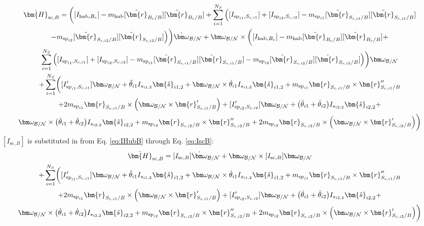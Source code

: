 \begin{multline}
	\dot{\bm{H}}_{\text{sc},B} = \bigg([I_{\text{hub},B_c}]  - m_{\text{hub}} [\tilde{\bm{r}}_{B_c/B}] [\tilde{\bm{r}}_{B_c/B}] +
	\sum\limits_{i=1}^{N_S} \Big([I_{\text{sp}_{i1},S_{c,i1}}]+ [I_{\text{sp}_{i2},S_{c,i2}}] - m_{\text{sp}_{i1}} [\tilde{\bm{r}}_{S_{c,i1}/B}] [\tilde{\bm{r}}_{S_{c,i1}/B}] \\
	- m_{\text{sp}_{i2}} [\tilde{\bm{r}}_{S_{c,i2}/B}] [\tilde{\bm{r}}_{S_{c,i2}/B}]   \Big)\bigg)\dot{\bm\omega}_{\cal B/N}	+ \bm\omega_{\cal B/N} \times \bigg([I_{\text{hub},B_c}] - m_{\text{hub}} [\tilde{\bm{r}}_{B_c/B}] [\tilde{\bm{r}}_{B_c/B}] + \\
	\sum\limits_{i=1}^{N_S}\Big(  [I_{\text{sp}_{i1},S_{c,i1}}]+ [I_{\text{sp}_{i2},S_{c,i2}}] - m_{\text{sp}_{i1}} [\tilde{\bm{r}}_{S_{c,i1}/B}] [\tilde{\bm{r}}_{S_{c,i1}/B}] - m_{\text{sp}_{i2}} [\tilde{\bm{r}}_{S_{c,i2}/B}] [\tilde{\bm{r}}_{S_{c,i2}/B}]  \Big) \bigg) \bm\omega_{\cal B/N} \\
	+\sum\limits_{i=1}^{N_S} \biggl( [I'_{\text{sp}_{i1},S_{c,i1}}] \bm\omega_{\cal B/N}
	+ \ddot{\theta}_{i1} I_{s_{i1,2}}\bm{\hat{s}}_{i1,2}+ \bm\omega_{\cal B/N} \times \dot{\theta}_{i1} I_{s_{i1,2}}\bm{\hat{s}}_{i1,2}	+m_{\text{sp}_{i1}} \bm{r}_{S_{c,i1}/B} \times \bm{r}''_{S_{c,i1}/B} \\
	+ 2 m_{\text{sp}_{i1}} \bm{r}_{S_{c,i1}/B} \times \Big( \bm\omega_{\cal B/N} \times \bm{r}'_{S_{c,i1}/B}\Big)	+ [I'_{\text{sp}_{i2},S_{c,i2}}] \bm\omega_{\cal B/N}
	+ \big(\ddot{\theta}_{i1} + \ddot{\theta}_{i2}\big) I_{s_{i2,2}}\bm{\hat{s}}_{i2,2}+ \\
	\bm\omega_{\cal B/N} \times \big(\dot{\theta}_{i1} + \dot{\theta}_{i2}\big) I_{s_{i2,2}}\bm{\hat{s}}_{i2,2}
	+m_{\text{sp}_{i2}} \bm{r}_{S_{c,i2}/B} \times \bm{r}''_{S_{c,i2}/B} + 2 m_{\text{sp}_{i2}} \bm{r}_{S_{c,i2}/B} \times \Big(\bm\omega_{\cal B/N} \times \bm{r}'_{S_{c,i2}/B}\Big)\biggr)
	\label{eq:Hbdot17}
\end{multline}
$[I_{\text{sc},B}]$ is substituted in from Eq. \ref{eq:IHubB} through Eq. \ref{eq:IscB}:
\begin{multline}
	\dot{\bm{H}}_{\text{sc},B} = [I_{\text{sc},B}]\dot{\bm\omega}_{\cal B/N}	+ \bm\omega_{\cal B/N} \times [I_{\text{sc},B}] \bm\omega_{\cal B/N} \\
	+\sum\limits_{i=1}^{N_S} \biggl( [I'_{\text{sp}_{i1},S_{c,i1}}] \bm\omega_{\cal B/N}
	+ \ddot{\theta}_{i1} I_{s_{i1,2}}\bm{\hat{s}}_{i1,2}+ \bm\omega_{\cal B/N} \times \dot{\theta}_{i1} I_{s_{i1,2}}\bm{\hat{s}}_{i1,2}	+m_{\text{sp}_{i1}} \bm{r}_{S_{c,i1}/B} \times \bm{r}''_{S_{c,i1}/B} \\
	+ 2 m_{\text{sp}_{i1}} \bm{r}_{S_{c,i1}/B} \times \Big( \bm\omega_{\cal B/N} \times \bm{r}'_{S_{c,i1}/B}\Big)	+ [I'_{\text{sp}_{i2},S_{c,i2}}] \bm\omega_{\cal B/N}
	+ \big(\ddot{\theta}_{i1} + \ddot{\theta}_{i2}\big) I_{s_{i2,2}}\bm{\hat{s}}_{i2,2}+ \\
	\bm\omega_{\cal B/N} \times \big(\dot{\theta}_{i1} + \dot{\theta}_{i2}\big) I_{s_{i2,2}}\bm{\hat{s}}_{i2,2}
	+m_{\text{sp}_{i2}} \bm{r}_{S_{c,i2}/B} \times \bm{r}''_{S_{c,i2}/B} + 2 m_{\text{sp}_{i2}} \bm{r}_{S_{c,i2}/B} \times \Big(\bm\omega_{\cal B/N} \times \bm{r}'_{S_{c,i2}/B}\Big)\biggr)
	\label{eq:Hbdot18}
\end{multline}
